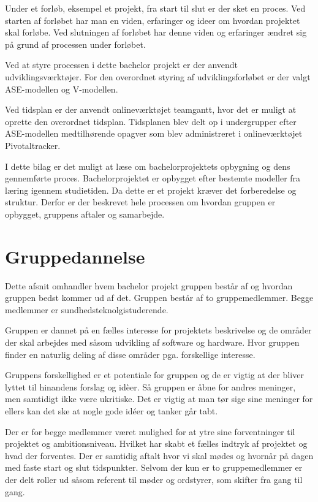 Under et forløb, eksempel et projekt, fra start til slut er der sket en proces. Ved starten af forløbet har man en viden, erfaringer og ideer om hvordan projektet skal forløbe. Ved slutningen af forløbet har denne viden og erfaringer ændret sig på grund af processen under forløbet. 

Ved at styre processen i dette bachelor projekt er der anvendt udviklingsværktøjer. For den overordnet styring af udviklingsforløbet er der valgt ASE-modellen og V-modellen.

Ved tidsplan er der anvendt onlineværktøjet teamgantt, hvor det er muligt at oprette den overordnet tidsplan. Tidsplanen blev delt op i undergrupper efter ASE-modellen medtilhørende opagver som blev administreret i onlineværktøjet Pivotaltracker. 




I dette bilag er det muligt at læse om bachelorprojektets opbygning og dens gennemførte proces. Bachelorprojektet er opbygget efter bestemte modeller fra læring igennem studietiden. Da dette er et projekt kræver det forberedelse og struktur. Derfor er der beskrevet hele processen om hvordan gruppen er opbygget, gruppens aftaler og samarbejde.

\chapter{Gruppedannelse}
Dette afsnit omhandler hvem bachelor projekt gruppen består af og hvordan gruppen bedst kommer ud af det. Gruppen består af to gruppemedlemmer. Begge medlemmer er sundhedsteknolgistuderende.

Gruppen er dannet på en fælles interesse for projektets beskrivelse og de områder der skal arbejdes med såsom udvikling af software og hardware. Hvor gruppen finder en naturlig deling af disse områder pga. forskellige interesse. 

Gruppens forskellighed er et potentiale for gruppen og de er vigtig at der bliver lyttet til hinandens forslag og idèer. Så gruppen er åbne for andres meninger, men samtidigt ikke være ukritiske. Det er vigtig at man tør sige sine meninger for ellers kan det ske at nogle gode idéer og tanker går tabt.

Der er for begge medlemmer været mulighed for at ytre sine forventninger til projektet og ambitionsniveau. Hvilket har skabt et fælles indtryk af projektet og hvad der forventes. Der er samtidig aftalt hvor vi skal mødes og hvornår på dagen med faste start og slut tidspunkter. Selvom der kun er to gruppemedlemmer er der delt roller ud såsom referent til møder og ordstyrer, som skifter fra gang til gang.

